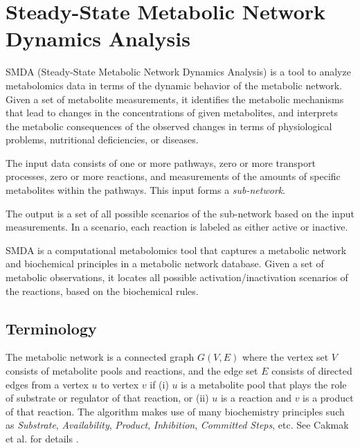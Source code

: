 \section{Steady-State Metabolic Network Dynamics Analysis}
\label{sect:background_smda}

SMDA (Steady-State Metabolic Network Dynamics Analysis) is a tool to analyze
metabolomics data in terms of the dynamic behavior of the metabolic network.
Given a set of metabolite measurements, it identifies the metabolic mechanisms
that lead to changes in the concentrations of given metabolites, and interprets
the metabolic consequences of the observed changes in terms of physiological
problems, nutritional deficiencies, or diseases.

The input data consists of one or more pathways, zero or more transport
processes, zero or more reactions, and measurements of the amounts of specific
metabolites within the pathways. This input forms a \emph{sub-network}.

The output is a set of all possible scenarios of the sub-network based on the
input measurements. In a scenario, each reaction is labeled as either active or
inactive.

SMDA is a computational metabolomics tool that captures a metabolic network and
biochemical principles in a metabolic network database. Given a set of metabolic
observations, it locates all possible activation/inactivation scenarios of the
reactions, based on the biochemical rules.

\subsection{Terminology}
\label{sect:background_smda_terminology}

The metabolic network is a connected graph $G(V,E)$ where the vertex set $V$
consists of metabolite pools and reactions, and the edge set $E$ consists of
directed edges from a vertex $u$ to vertex $v$ if (i) $u$ is a metabolite pool
that plays the role of substrate or regulator of that reaction, or (ii) $u$ is a
reaction and $v$ is a product of that reaction. The algorithm makes use of many
biochemistry principles such as \emph{Substrate}, \emph{Availability},
\emph{Product}, \emph{Inhibition}, \emph{Committed Steps}, etc. See Cakmak et
al. for details \cite{smda-basic}.

